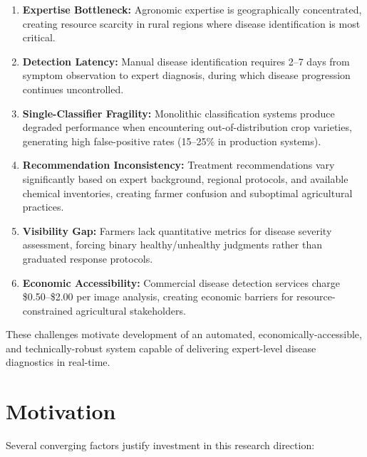 \documentclass[conference]{IEEEtran}
\begin{document}
\begin{enumerate}
\item \textbf{Expertise Bottleneck:} Agronomic expertise is geographically concentrated, creating resource scarcity in rural regions where disease identification is most critical.

\item \textbf{Detection Latency:} Manual disease identification requires 2--7 days from symptom observation to expert diagnosis, during which disease progression continues uncontrolled.

\item \textbf{Single-Classifier Fragility:} Monolithic classification systems produce degraded performance when encountering out-of-distribution crop varieties, generating high false-positive rates (15--25\% in production systems).

\item \textbf{Recommendation Inconsistency:} Treatment recommendations vary significantly based on expert background, regional protocols, and available chemical inventories, creating farmer confusion and suboptimal agricultural practices.

\item \textbf{Visibility Gap:} Farmers lack quantitative metrics for disease severity assessment, forcing binary healthy/unhealthy judgments rather than graduated response protocols.

\item \textbf{Economic Accessibility:} Commercial disease detection services charge \$0.50--\$2.00 per image analysis, creating economic barriers for resource-constrained agricultural stakeholders.
\end{enumerate}

These challenges motivate development of an automated, economically-accessible, and technically-robust system capable of delivering expert-level disease diagnostics in real-time.

\section{Motivation}
\label{sec:motivation}

Several converging factors justify investment in this research direction:
\end{document}

